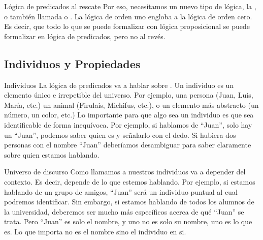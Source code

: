 
\begin{frame}{Lógica de predicados al rescate}
  Por eso, necesitamos un nuevo tipo de lógica, la ,
  o también llamada  o .
  \jump
  \jump
  La lógica de orden uno engloba a la lógica de orden cero. Es decir, que todo
  lo que se puede formalizar con lógica proposicional se puede formalizar en
  lógica de predicados, pero no al revés.
\end{frame}


\subsection{Individuos y Propiedades}

\begin{frame}{Individuos}
  La lógica de predicados va a hablar sobre .
  \jump
  Un individuo es un elemento único e irrepetible del universo. Por ejemplo,
  una persona (Juan, Luis, María, etc.) un animal (Firulais, Michifus, etc.),
  o un elemento más abstracto (un número, un color, etc.)
  \jump
  Lo importante para que algo sea un individuo es que sea identificable de
  forma inequívoca. Por ejemplo, si hablamos de ``Juan'', solo hay un ``Juan'',
  podemos saber quien es y señalarlo con el dedo. Si hubiera dos personas con
  el nombre ``Juan'' deberíamos desambiguar para saber claramente sobre quien
  estamos hablando.
\end{frame}


\begin{frame}{Universo de discurso}
  Como llamamos a nuestros individuos va a depender del contexto. Es decir,
  depende de lo que estemos hablando. Por ejemplo, si estamos hablando de un
  grupo de amigos, ``Juan'' será un individuo puntual al cual podremos
  identificar.
  \jump
  Sin embargo, si estamos hablando de todos los alumnos de la universidad,
  deberemos ser mucho más específicos acerca de qué ``Juan'' se trata.
  \jump
  Pero ``Juan'' es solo el nombre, y uno no es solo su nombre, uno es lo que es.
  Lo que importa no es el nombre sino el individuo en si.
\end{frame}

